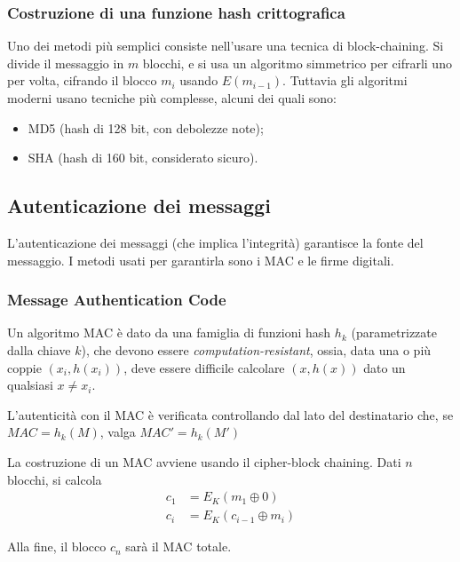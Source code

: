 \documentclass[a4paper, 11pt, twoside]{article}
\begin{document}
	\subsubsection{Costruzione di una funzione hash crittografica}
	Uno dei metodi più semplici consiste nell'usare una tecnica di block-chaining.
	Si divide il messaggio in $m$ blocchi, e si usa un algoritmo simmetrico per cifrarli uno per volta, cifrando il blocco $m_i$ usando $E(m_{i-1})$. Tuttavia gli algoritmi moderni usano tecniche più complesse, alcuni dei quali sono:\begin{itemize}
		\item MD5 (hash di 128 bit, con debolezze note);
		\item SHA (hash di 160 bit, considerato sicuro).
	\end{itemize}

	\subsection{Autenticazione dei messaggi}
	L'autenticazione dei messaggi (che implica l'integrità) garantisce la fonte del messaggio. I metodi usati per garantirla sono i MAC e le firme digitali.
	
	\subsubsection{Message Authentication Code}
	Un algoritmo MAC è dato da una famiglia di funzioni hash $h_k$ (parametrizzate dalla chiave $k$), che devono essere \textit{computation-resistant}, ossia, data una o più coppie $(x_i, h(x_i))$, deve essere difficile calcolare $(x, h(x))$ dato un qualsiasi $x \neq x_i$.
	
	L'autenticità con il MAC è verificata controllando dal lato del destinatario che, se $MAC = h_k(M)$, valga $MAC' = h_k(M')$
	
	La costruzione di un MAC avviene usando il cipher-block chaining. Dati $n$ blocchi, si calcola \begin{align*}
		c_1 &= E_K(m_1 \oplus 0) \\
		c_i &= E_K(c_{i-1} \oplus m_i)
	\end{align*}
	
	Alla fine, il blocco $c_n$ sarà il MAC totale.
	
\end{document}
